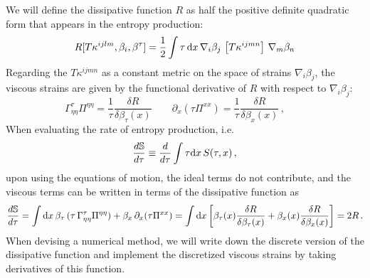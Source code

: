 \documentclass[12pt,aps,preprint,nofootinbib,noshowkeys,noshowpacs,longbibliography,superscriptaddress,tightenlines]{revtex4-2}
\def\eq#1{(\ref{#1})}
\def\app#1{App.~\ref{#1}}
\def\st{\begin{equation}}
\def\stp{\end{equation}}
\def\dd{{\rm d}}
\def\tideal{{\mathcal T}}
\begin{document}
We will define the dissipative function $R$ as half the positive definite quadratic form that appears in the entropy production:
\begin{equation}
R[T\kappa^{ijlm}, \beta_i, \beta^\tau] =  \frac{1}{2} \int  \tau  \, \dd x  \, \nabla_{i}\beta_{j} \, \left[  T\kappa^{ijmn}  \right] \,  \nabla_{m}\beta_{n}  
\end{equation}
Regarding the $T\kappa^{ijmn}$ as a constant metric on the space of strains $\nabla_i \beta_j$,  the viscous strains are given by the functional derivative of $R$ with respect to $\nabla_i \beta_j$:
\st
\Gamma^{\tau}_{\eta\eta} \Pi^{\eta\eta} =  \frac{1}{\tau} \frac{\delta R}{\delta
\beta_{\tau}(x)}   \qquad 
\partial_x (\tau \Pi^{xx}) =  \frac{1}{\tau} \frac{\delta R}{\delta \beta_x(x)} \, , \qquad
\stp
When evaluating the rate of entropy production, i.e.  
\begin{equation}
\frac{d\mathbb{S}}{d\tau} \equiv \frac{d}{d\tau} \int \tau \dd x\, S(\tau, x)\, , 
\end{equation}
upon using the equations of motion, the ideal terms do not contribute, and the viscous terms can be written in terms of the dissipative function as
\begin{equation}
 \frac{d\mathbb{S}}{d\tau} = \int \dd x \, \beta_\tau \,  (\tau \, \Gamma^{\tau}_{\eta\eta} \Pi^{\eta\eta}) + \beta_x \, \partial_x (\tau\Pi^{xx}) = \int \dd x  \left[  \beta_\tau(x) 
\frac{\delta R}{\delta
\beta_{\tau}(x)} +  \beta_x(x) \frac{\delta R}{\delta \beta_x(x)}  \right]
 = 2 R \, .
\end{equation}
When devising a numerical method,  we will write down the discrete version of the dissipative function and implement the discretized viscous strains by taking derivatives of this function. 

\end{document}
